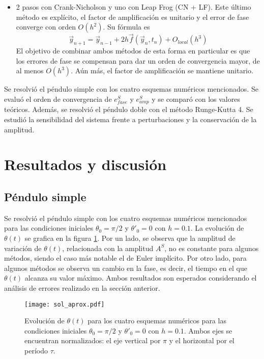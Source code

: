 \documentclass[aps,prb,twocolumn,superscriptaddress,floatfix,longbibliography]{revtex4-2}
\newif\ifptitle
\newif\ifpnumber
\newcounter{para}
\newcommand\ptitle[1]{\par\refstepcounter{para}
{\ifpnumber{\noindent\textcolor{lightgray}{\textbf{\thepara}}\indent}\fi}
{\ifptitle{\textbf{[{#1}]}}\fi}}
\begin{document}
\begin{itemize}
  \item 2 pasos con Crank-Nicholson y uno con Leap Frog (CN + LF). Este último método es explícito, el factor de amplificación es unitario y el error de fase converge con orden $O(h^2)$. Su fórmula es
  \begin{equation}
    \vec{y}_{n+1} = \vec{y}_{n-1} + 2 h \vec{f}(\vec{y}_n, t_n) + O_{local}(h^3)
    \label{eq:Leap_Frog}
  \end{equation}
  El objetivo de combinar ambos métodos de esta forma en particular es que los errores de fase se compensan para dar un orden de convergencia mayor, de al menos $O(h^3)$. Aún más, el factor de amplificación se mantiene unitario.


\end{itemize}

\ptitle{Resumen de lo que se hará. Qué se resuelve con qué}
Se resolvió el péndulo simple con los cuatro esquemas numéricos mencionados. Se evaluó el orden de convergencia de $e^S_{fase}$ y $e^S_{amp}$ y se comparó con los valores teóricos. Además, se resolvió el péndulo doble con el método Runge-Kutta 4. Se estudió la sensibilidad del sistema frente a perturbaciones y la conservación de la amplitud.





\section{Resultados y discusión}

\subsection{Péndulo simple}

Se resolvió el péndulo simple con los cuatro esquemas numéricos mencionados para las condiciones iniciales $\theta_0 = \pi/2$ y $\theta'_0 = 0$ con $h = 0.1$. La evolución de $\theta(t)$ se grafica en la figura \ref{fig:sol_aprox}. Por un lado, se observa que la amplitud de variación de $\theta(t)$, relacionada con la amplitud $A^S$, no es constante para algunos métodos, siendo el caso más notable el de Euler implícito. Por otro lado, para algunos métodos se observa un cambio en la fase, es decir, el tiempo en el que $\theta(t)$ alcanza su valor máximo. Ambos resultados son esperados considerando el análisis de errores realizado en la sección anterior.


\begin{figure}[h]
  \texttt{[image: sol\_aprox.pdf]}
  \caption{Evolución de $\theta(t)$ para los cuatro esquemas numéricos para las condiciones iniciales $\theta_0 = \pi/2$ y $\theta'_0 = 0$ con $h = 0.1$. Ambos ejes se encuentran normalizados: el eje vertical por $\pi$ y el horizontal por el período $\tau$.}
   \label{fig:sol_aprox}
\end{figure}
\end{document}
